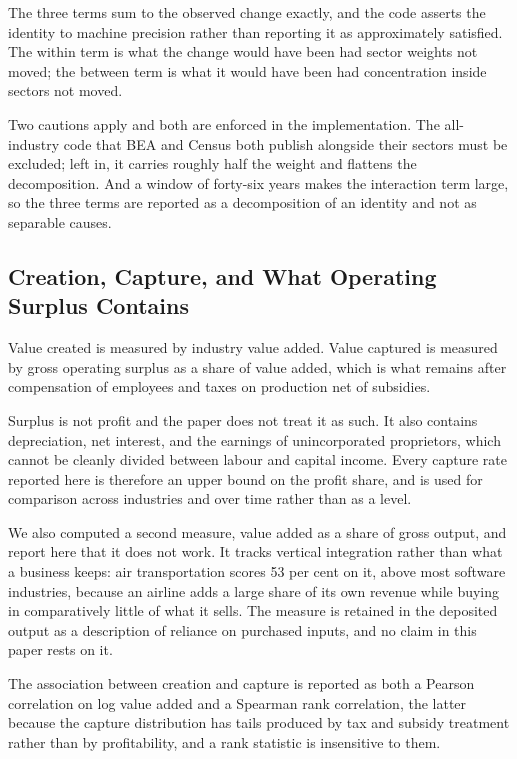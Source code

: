 \documentclass[jrfm,article,submit,pdftex,moreauthors]{Definitions/mdpi}
\begin{document}
The three terms sum to the observed change exactly, and the code asserts the identity to
machine precision rather than reporting it as approximately satisfied. The within term is
what the change would have been had sector weights not moved; the between term is what it
would have been had concentration inside sectors not moved.

Two cautions apply and both are enforced in the implementation. The all-industry code that
BEA and Census both publish alongside their sectors must be excluded; left in, it carries
roughly half the weight and flattens the decomposition. And a window of forty-six years
makes the interaction term large, so the three terms are reported as a decomposition of an
identity and not as separable causes.

\subsection{Creation, Capture, and What Operating Surplus Contains}
\label{subsec:capture}

Value created is measured by industry value added. Value captured is measured by gross operating surplus as a share of value added, which
is what remains after compensation of employees and taxes on production net of
subsidies.

Surplus is not profit and the paper does not treat it as such. It also contains
depreciation, net interest, and the earnings of unincorporated proprietors, which cannot be
cleanly divided between labour and capital income. Every capture rate reported here is
therefore an upper bound on the profit share, and is used for comparison across industries
and over time rather than as a level.

We also computed a second measure, value added as a share of gross output, and report here
that it does not work. It tracks vertical integration rather than what a business keeps: air
transportation scores 53 per cent on it, above most software industries, because an airline
adds a large share of its own revenue while buying in comparatively little of what it sells.
The measure is retained in the deposited output as a description of reliance on purchased
inputs, and no claim in this paper rests on it.

The association between creation and capture is reported as both a Pearson correlation on
log value added and a Spearman rank correlation, the latter because the capture distribution
has tails produced by tax and subsidy treatment rather than by profitability, and a rank
statistic is insensitive to them.
\end{document}
